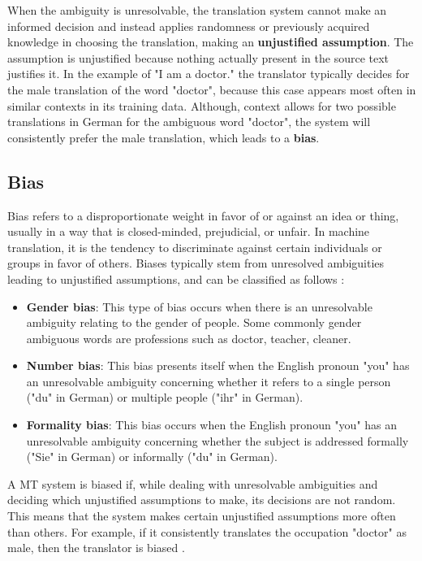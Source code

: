 When the ambiguity is unresolvable, the translation system cannot make an informed decision and instead applies randomness or previously acquired knowledge in choosing the translation, making an \textbf{unjustified assumption}. The assumption is unjustified because nothing actually present in the source text justifies it. In the example of "I am a doctor." the translator typically decides for the male translation of the word "doctor", because this case appears most often in similar contexts in its training data. Although, context allows for two possible translations in German for the ambiguous word "doctor", the system will consistently prefer the male translation, which leads to a \textbf{bias}. 

\subsection{Bias}
\label{sec:Background:Bias}
Bias refers to a disproportionate weight in favor of or against an idea or thing, usually in a way that is closed-minded, prejudicial, or unfair. In machine translation, it is the tendency to discriminate against certain individuals or groups in favor of others. Biases typically stem from unresolved ambiguities leading to unjustified assumptions, and can be classified as follows \parencite{bias_taxonomy}:
\begin{itemize}
    \item \textbf{Gender bias}: This type of bias occurs when there is an unresolvable ambiguity relating to the gender of people. Some commonly gender ambiguous words are professions such as doctor, teacher, cleaner. 
    \item \textbf{Number bias}: This bias presents itself when the English pronoun "you" has an unresolvable ambiguity concerning whether it refers to a single person ("du" in German) or multiple people ("ihr" in German). 
    \item \textbf{Formality bias}: This bias occurs when the English pronoun "you" has an unresolvable ambiguity concerning whether the subject is addressed formally ("Sie" in German) or informally ("du" in German). 
\end{itemize}

A MT system is biased if, while dealing with unresolvable ambiguities and deciding which unjustified assumptions to make, its decisions are not random. This means that the system makes certain unjustified assumptions more often than others. For example, if it consistently translates the occupation "doctor" as male, then the translator is biased \parencite{bias_taxonomy}.


